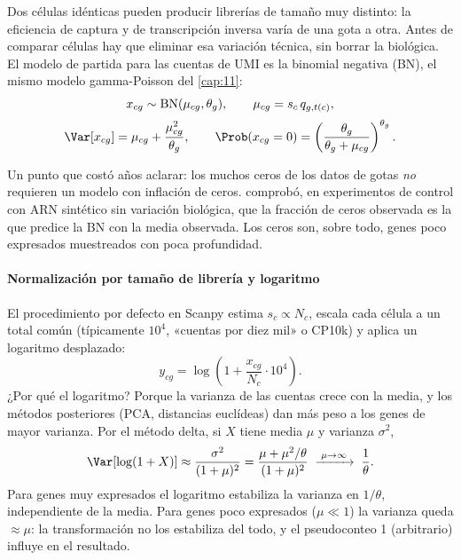 Dos células idénticas pueden producir librerías de tamaño muy distinto: la eficiencia de captura y de transcripción inversa varía de una gota a otra. Antes de comparar células hay que eliminar esa variación técnica, sin borrar la biológica. El modelo de partida para las cuentas de UMI es la binomial negativa (BN), el mismo modelo gamma-Poisson del \cref{cap:11}:
\begin{equation}\label{eq:12-nb}
\begin{gathered}
x_{cg}\sim\mathrm{BN}(\mu_{cg},\theta_g),\qquad \mu_{cg}=s_c\,q_{g,t(c)},\\[2pt]
\Var[x_{cg}]=\mu_{cg}+\frac{\mu_{cg}^2}{\theta_g},\qquad \Prob(x_{cg}=0)=\left(\frac{\theta_g}{\theta_g+\mu_{cg}}\right)^{\theta_g}.
\end{gathered}
\end{equation}
\begin{simbolos}
\end{simbolos}
Un punto que costó años aclarar: los muchos ceros de los datos de gotas \emph{no} requieren un modelo con inflación de ceros. \textcite{c12-svensson2020} comprobó, en experimentos de control con ARN sintético sin variación biológica, que la fracción de ceros observada es la que predice la BN con la media observada. Los ceros son, sobre todo, genes poco expresados muestreados con poca profundidad.

\paragraph{Normalización por tamaño de librería y logaritmo} El procedimiento por defecto en Scanpy estima $s_c\propto N_c$, escala cada célula a un total común (típicamente $10^4$, «cuentas por diez mil» o CP10k) y aplica un logaritmo desplazado:
\begin{equation}\label{eq:12-lognorm}
y_{cg} = \log\!\left(1 + \frac{x_{cg}}{N_c}\cdot 10^4\right).
\end{equation}
¿Por qué el logaritmo? Porque la varianza de las cuentas crece con la media, y los métodos posteriores (PCA, distancias euclídeas) dan más peso a los genes de mayor varianza. Por el método delta, si $X$ tiene media $\mu$ y varianza $\sigma^2$,
\begin{equation}\label{eq:12-delta}
\Var[\log(1+X)] \approx \frac{\sigma^2}{(1+\mu)^2} = \frac{\mu+\mu^2/\theta}{(1+\mu)^2}\;\xrightarrow{\;\mu\to\infty\;}\;\frac{1}{\theta}.
\end{equation}
Para genes muy expresados el logaritmo estabiliza la varianza en $1/\theta$, independiente de la media. Para genes poco expresados ($\mu\ll 1$) la varianza queda $\approx\mu$: la transformación no los estabiliza del todo, y el pseudoconteo 1 (arbitrario) influye en el resultado.

